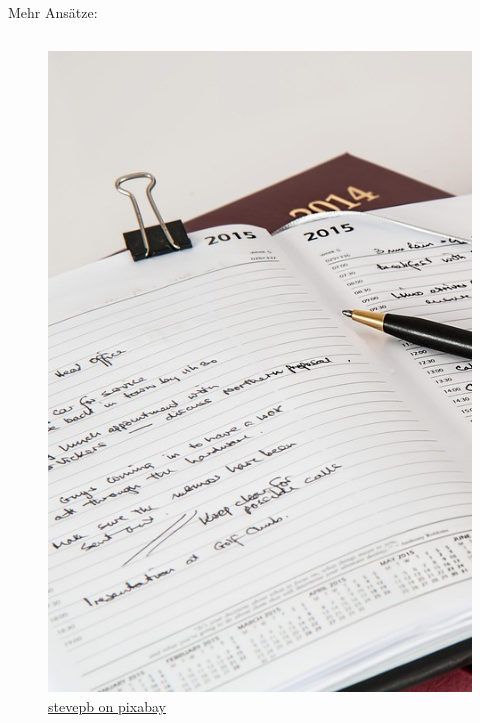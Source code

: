 \documentclass[aspectratio=169,shownotes]{beamer}
\begin{document}
\begin{frame}{Mehr Ansätze:}
    \begin{columns}[t]
        \begin{column}{0.3\textwidth}
            \begin{figure}
                \begin{flushleft}
                    \includegraphics[width=\textwidth]{graphics/diary-614149_960_720.jpg}
                    \caption*{\href{https://pixabay.com/de/photos/tagebuch-stift-notizbuch-januar-614149/}{stevepb on pixabay}}    
                \end{flushleft}                
            \end{figure}
            

\end{column}
\end{columns}
\end{frame}
\end{document}

